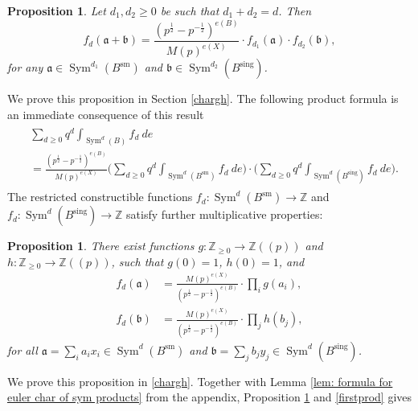 \documentclass{amsart}
\newtheorem{proposition}[theorem]{Proposition}
\theoremstyle{definition}
\newcommand{\ZZ} {\mathbb{Z}}		%
\newcommand{\Sym}{\operatorname{Sym}}
\newcommand{\sm}{\operatorname{sm}}
\newcommand{\sing}{\operatorname{sing}}
\begin{document}
\begin{proposition} \label{mult1}
Let $d_1, d_2 \geq 0$ be such that $d_1+d_2 = d$. Then 
$$ 
f_d(\mathfrak{a} + \mathfrak{b}) =\frac{(p^{\frac{1}{2}} - p^{-\frac{1}{2}})^{e(B)}}{M(p)^{e(X)}} \cdot f_{d_1}(\mathfrak{a}) \cdot f_{d_2}(\mathfrak{b}), 
$$
for any $\mathfrak{a} \in \Sym^{d_1}(B^{\sm})$ and $\mathfrak{b} \in \Sym^{d_2}(B^{\sing})$. 
\end{proposition}
We prove this proposition in Section \ref{chargh}. The following product formula is an immediate consequence of this result
\begin{align}
\begin{split} \label{firstprod}
&\sum_{d \geq 0} q^d \int_{\Sym^d(B)} f_d \ de \\
&= \frac{(p^{\frac{1}{2}} - p^{-\frac{1}{2}})^{e(B)}}{M(p)^{e(X)}}  \Big( \sum_{d \geq 0} q^d \int_{\Sym^d(B^{\sm})} f_d \ de \Big) \cdot \Big( \sum_{d \geq 0} q^d \int_{\Sym^d(B^{\sing})} f_d \ de \Big). 
\end{split}
\end{align}
The restricted constructible functions $f_d  : \Sym^d(B^{\sm}) \rightarrow \ZZ$ and $f_d  : \Sym^d(B^{\sing}) \rightarrow \ZZ$ satisfy further multiplicative properties:
\begin{proposition} \label{mult2}
There exist functions $g : \ZZ_{\geq 0} \rightarrow \ZZ(\!(p)\!)$ and $h : \ZZ_{\geq 0} \rightarrow \ZZ(\!(p)\!)$, such that $g(0)=1$, $h(0)=1$, and
\begin{align*}
f_{d}(\mathfrak{a}) &= \frac{M(p)^{e(X)}}{(p^{\frac{1}{2}} - p^{-\frac{1}{2}})^{e(B)}} \cdot \prod_{i} g(a_i), \\
f_{d}(\mathfrak{b}) &= \frac{M(p)^{e(X)}}{(p^{\frac{1}{2}} - p^{-\frac{1}{2}})^{e(B)}} \cdot \prod_{j} h(b_j), 
\end{align*}
for all $\mathfrak{a} = \sum_i a_i x_i \in \Sym^{d}(B^{\sm})$ and $\mathfrak{b} = \sum_j b_j y_j \in \Sym^{d}(B^{\sing})$.
\end{proposition}
We prove this proposition in \ref{chargh}. Together with Lemma \ref{lem: formula for euler char of sym products} from the appendix, Proposition \ref{mult2} and \eqref{firstprod} gives
\end{document}
